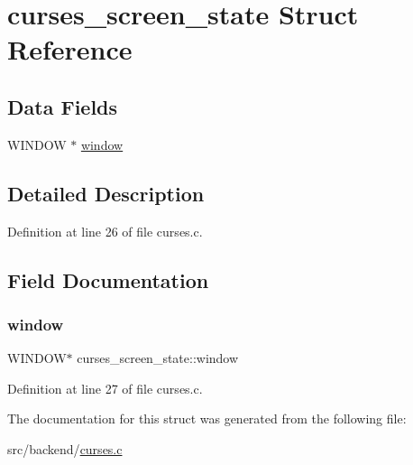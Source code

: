 \hypertarget{structcurses__screen__state}{}\section{curses\+\_\+screen\+\_\+state Struct Reference}
\label{structcurses__screen__state}
\subsection*{Data Fields}
\begin{DoxyCompactItemize}
\item 
W\+I\+N\+D\+OW $\ast$ \hyperlink{structcurses__screen__state_a65ce2662ab8c79817e1ec61efa09b6a4}{window}
\end{DoxyCompactItemize}


\subsection{Detailed Description}


Definition at line 26 of file curses.\+c.



\subsection{Field Documentation}
\mbox{\label{structcurses__screen__state_a65ce2662ab8c79817e1ec61efa09b6a4}} 
\subsubsection{\texorpdfstring{window}{window}}
{\footnotesize\ttfamily W\+I\+N\+D\+OW$\ast$ curses\+\_\+screen\+\_\+state\+::window}



Definition at line 27 of file curses.\+c.



The documentation for this struct was generated from the following file\+:\begin{DoxyCompactItemize}
\item 
src/backend/\hyperlink{curses_8c}{curses.\+c}\end{DoxyCompactItemize}
